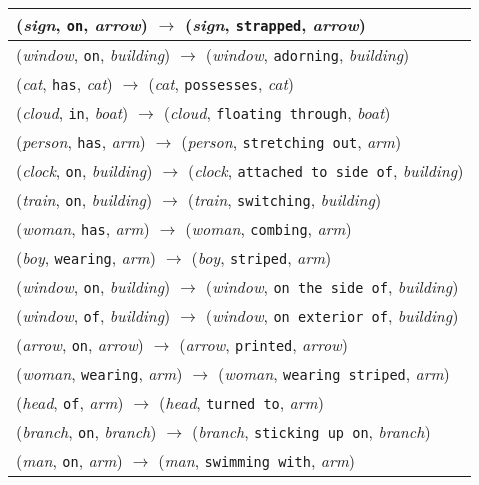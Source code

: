 \documentclass[runningheads]{llncs}
\begin{document}
{\begin{longtable}{ l }
(\textit{sign}, \texttt{on}, \textit{arrow}) $\rightarrow$ (\textit{sign}, \texttt{strapped}, \textit{arrow}) \\ \hline
(\textit{window}, \texttt{on}, \textit{building}) $\rightarrow$ (\textit{window}, \texttt{adorning}, \textit{building}) \\ \hline
(\textit{cat}, \texttt{has}, \textit{cat}) $\rightarrow$ (\textit{cat}, \texttt{possesses}, \textit{cat}) \\ \hline
(\textit{cloud}, \texttt{in}, \textit{boat}) $\rightarrow$ (\textit{cloud}, \texttt{floating through}, \textit{boat}) \\ \hline
(\textit{person}, \texttt{has}, \textit{arm}) $\rightarrow$ (\textit{person}, \texttt{stretching out}, \textit{arm}) \\ \hline
(\textit{clock}, \texttt{on}, \textit{building}) $\rightarrow$ (\textit{clock}, \texttt{attached to side of}, \textit{building}) \\ \hline
(\textit{train}, \texttt{on}, \textit{building}) $\rightarrow$ (\textit{train}, \texttt{switching}, \textit{building}) \\ \hline
(\textit{woman}, \texttt{has}, \textit{arm}) $\rightarrow$ (\textit{woman}, \texttt{combing}, \textit{arm}) \\ \hline
(\textit{boy}, \texttt{wearing}, \textit{arm}) $\rightarrow$ (\textit{boy}, \texttt{striped}, \textit{arm}) \\ \hline
(\textit{window}, \texttt{on}, \textit{building}) $\rightarrow$ (\textit{window}, \texttt{on the side of}, \textit{building}) \\ \hline
(\textit{window}, \texttt{of}, \textit{building}) $\rightarrow$ (\textit{window}, \texttt{on exterior of}, \textit{building}) \\ \hline
(\textit{arrow}, \texttt{on}, \textit{arrow}) $\rightarrow$ (\textit{arrow}, \texttt{printed}, \textit{arrow}) \\ \hline
(\textit{woman}, \texttt{wearing}, \textit{arm}) $\rightarrow$ (\textit{woman}, \texttt{wearing striped}, \textit{arm}) \\ \hline
(\textit{head}, \texttt{of}, \textit{arm}) $\rightarrow$ (\textit{head}, \texttt{turned to}, \textit{arm}) \\ \hline
(\textit{branch}, \texttt{on}, \textit{branch}) $\rightarrow$ (\textit{branch}, \texttt{sticking up on}, \textit{branch}) \\ \hline
(\textit{man}, \texttt{on}, \textit{arm}) $\rightarrow$ (\textit{man}, \texttt{swimming with}, \textit{arm}) \\ \hline

\end{longtable}}
\end{document}
